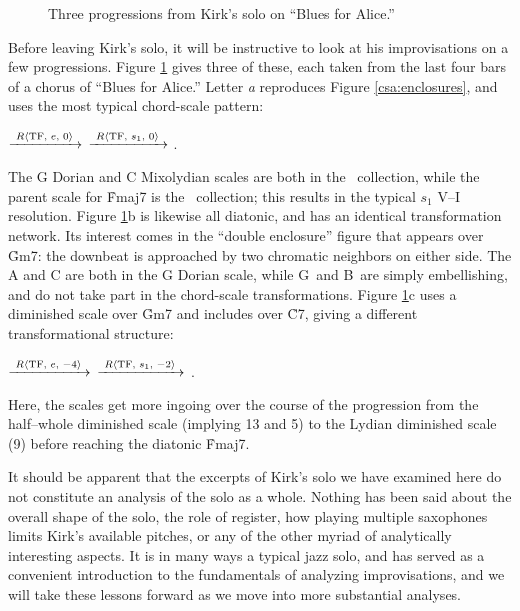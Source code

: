 \begin{figure}[tbp]
  \caption{Three \tfo progressions from Kirk's solo on ``Blues for Alice.''}
  \label{csa:kirk-tfo-progs}
\end{figure}

Before leaving Kirk's solo, it will be instructive to look at his
improvisations on a few \tfo progressions. Figure \ref{csa:kirk-tfo-progs}
gives three of these, each taken from the last four bars of a chorus of
``Blues for Alice.''  Letter \emph{a} reproduces Figure
\ref{csa:enclosures},
and uses the most typical \tfo chord-scale pattern: \\
{\centering {}
  $\xrightarrow{\text{ \mbox{\ensuremath{R\langle}TF, $e$, $0$\ensuremath{\rangle}} }}$ 
  $\xrightarrow{\text{ \mbox{\ensuremath{R\langle}TF, $s_1$, $0$\ensuremath{\rangle}} }}$ . \par
}
\noindent The G Dorian and C Mixolydian scales are both in the \flat\
collection, while the parent scale for \h{Fmaj7} is the \nat\ collection; this
results in the typical $s_1$ V--I resolution.\fn{csa-11} Figure
\ref{csa:kirk-tfo-progs}b is likewise all diatonic, and has an identical
transformation network. Its interest comes in the ``double enclosure'' figure
that appears over \h{Gm7}: the downbeat \Bflat is approached by two chromatic
neighbors on either side. The A and C are both in the G Dorian scale, while
G\sharp\ and B\nat\ are simply embellishing, and do not take part in the
chord-scale transformations. Figure \ref{csa:kirk-tfo-progs}c uses a
diminished scale over \h{Gm7} and
includes \Dflat over \h{C7}, giving a different transformational structure: \\
{\centering \cst{Gm7}{\flat}{HW dim.}
  $\xrightarrow{\text{ \mbox{\ensuremath{R\langle}TF, $e$, $-4$\ensuremath{\rangle}} }}$ 
  $\xrightarrow{\text{ \mbox{\ensuremath{R\langle}TF, $s_1$, $-2$\ensuremath{\rangle}} }}$
  . \par
}
\noindent Here, the scales get more ingoing over the course of the progression
from the half--whole diminished scale (implying \flat{}13 and \flat{}5) to the
Lydian diminished scale (\flat{}9) before reaching the diatonic \h{Fmaj7}.

It should be apparent that the excerpts of Kirk's solo we have examined here
do not constitute an analysis of the solo as a whole. Nothing has been said
about the overall shape of the solo, the role of register, how playing
multiple saxophones limits Kirk's available pitches, or any of the other
myriad of analytically interesting aspects. It is in many ways a typical jazz
solo, and has served as a convenient introduction to the fundamentals of
analyzing improvisations, and we will take these lessons forward as we move
into more substantial analyses.



